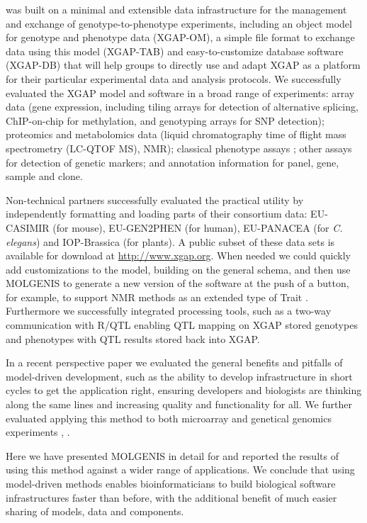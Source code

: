 \xqtlwb was built on a minimal and extensible data infrastructure for the management and 
exchange of genotype-to-phenotype experiments, including an object model for genotype and 
phenotype data (XGAP-OM), a simple file format to exchange data using this model (XGAP-TAB) 
and easy-to-customize database software (XGAP-DB) that will help groups to directly use and 
adapt XGAP as a platform for their particular experimental data and analysis protocols. We 
successfully evaluated the XGAP model and software in a broad range of experiments: array 
data (gene expression, including tiling arrays for detection of alternative splicing, 
ChIP-on-chip for methylation, and genotyping arrays for SNP detection); proteomics and 
metabolomics data (liquid chromatography time of flight mass spectrometry (LC-QTOF MS), NMR); 
classical phenotype assays \cite{Heap:2009, Bystrykh:2005, Li:2006, Keurentjes:2006, Stranger:2007, Bailey:2008, Beamer:1999}; 
other assays for detection of genetic markers; and annotation information for panel, gene, 
sample and clone. 

Non-technical partners successfully evaluated the practical utility by independently 
formatting and loading parts of their consortium data: EU-CASIMIR (for mouse), EU-GEN2PHEN (for human), 
EU-PANACEA (for \emph{C. elegans}) and IOP-Brassica (for plants). A public subset of these data sets 
is available for download at \url{http://www.xgap.org}. When needed we could quickly add customizations to the 
model, building on the general schema, and then use MOLGENIS to generate a new version of the 
software at the push of a button, for example, to support NMR methods as an extended type of 
Trait \cite{Fu:2009}. Furthermore we successfully integrated processing tools, such as a two-way 
communication with R/QTL \cite{Broman:2003, Arends:2010} enabling QTL mapping on XGAP 
stored genotypes and phenotypes with QTL results stored back into XGAP.

In a recent perspective paper \cite{Swertz:2007} we evaluated the general benefits and pitfalls of model-driven 
development, such as the ability to develop infrastructure in short cycles to get the application 
right, ensuring developers and biologists are thinking along the same lines and increasing quality 
and functionality for all. We further evaluated applying this method to both microarray and genetical 
genomics experiments \cite{Swertz:2004}, \cite{Swertz:2010a}.

Here we have presented MOLGENIS in detail for \xqtlwb and reported the results of using this 
method against a wider range of applications. We conclude that using model-driven methods enables 
bioinformaticians to build biological software infrastructures faster than before, with the additional 
benefit of much easier sharing of models, data and components.

